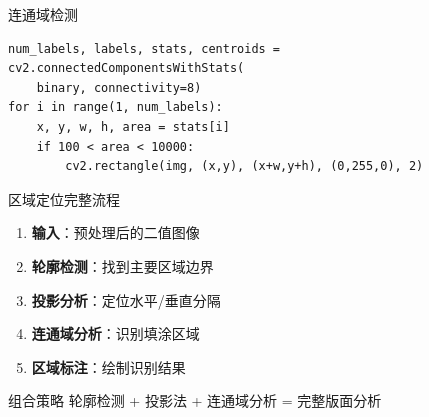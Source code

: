 \begin{frame}[fragile]{连通域检测}
    \begin{lstlisting}[basicstyle=\ttfamily\small]
num_labels, labels, stats, centroids = cv2.connectedComponentsWithStats(
    binary, connectivity=8)
for i in range(1, num_labels):
    x, y, w, h, area = stats[i]
    if 100 < area < 10000:
        cv2.rectangle(img, (x,y), (x+w,y+h), (0,255,0), 2)
    \end{lstlisting}

\end{frame}

\begin{frame}{区域定位完整流程}
    \begin{enumerate}
        \item \textbf{输入}：预处理后的二值图像
        \item \textbf{轮廓检测}：找到主要区域边界
        \item \textbf{投影分析}：定位水平/垂直分隔
        \item \textbf{连通域分析}：识别填涂区域
        \item \textbf{区域标注}：绘制识别结果
    \end{enumerate}

    \begin{block}{组合策略}
        轮廓检测 + 投影法 + 连通域分析 = 完整版面分析
    \end{block}
\end{frame}

